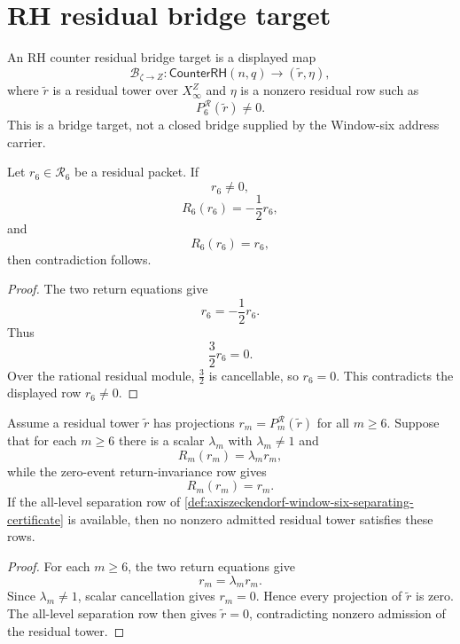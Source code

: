 \section{RH residual bridge target}
\label{sec:axiszeckendorf-rh-residual-bridge-target}

\begin{definition}
\label{def:axiszeckendorf-counter-residual-bridge-target}
An RH counter residual bridge target is a displayed map
$$
\mathcal B_{\zeta\to Z}
:
\mathsf{CounterRH}(n,q)
\to
(\widetilde r,\eta),
$$
where $\widetilde r$ is a residual tower over $X_\infty^Z$ and $\eta$ is a
nonzero residual row such as
$$
P_6^{\mathcal R}(\widetilde r)\neq 0.
$$
This is a bridge target, not a closed bridge supplied by the Window-six
address carrier.
\end{definition}

\begin{proposition}
\label{prop:axiszeckendorf-window-six-local-residual-contradiction}
Let $r_6\in\mathcal R_6$ be a residual packet.  If
$$
r_6\neq 0,
$$
$$
R_6(r_6)=-\frac{1}{2}r_6,
$$
and
$$
R_6(r_6)=r_6,
$$
then contradiction follows.
\end{proposition}

\begin{proof}
The two return equations give
$$
r_6=-\frac{1}{2}r_6.
$$
Thus
$$
\frac{3}{2}r_6=0.
$$
Over the rational residual module, $\frac{3}{2}$ is cancellable, so
$r_6=0$.  This contradicts the displayed row $r_6\neq0$.
\end{proof}

\begin{theorem}
\label{thm:axiszeckendorf-global-residual-contradiction-criterion}
Assume a residual tower $\widetilde r$ has projections
$r_m=P_m^{\mathcal R}(\widetilde r)$ for all $m\geq 6$.  Suppose that for
each $m\geq 6$ there is a scalar $\lambda_m$ with $\lambda_m\neq1$ and
$$
R_m(r_m)=\lambda_m r_m,
$$
while the zero-event return-invariance row gives
$$
R_m(r_m)=r_m.
$$
If the all-level separation row of
\autoref{def:axiszeckendorf-window-six-separating-certificate} is available,
then no nonzero admitted residual tower satisfies these rows.
\end{theorem}

\begin{proof}
For each $m\geq 6$, the two return equations give
$$
r_m=\lambda_m r_m.
$$
Since $\lambda_m\neq1$, scalar cancellation gives $r_m=0$.  Hence every
projection of $\widetilde r$ is zero.  The all-level separation row then
gives $\widetilde r=0$, contradicting nonzero admission of the residual
tower.
\end{proof}

